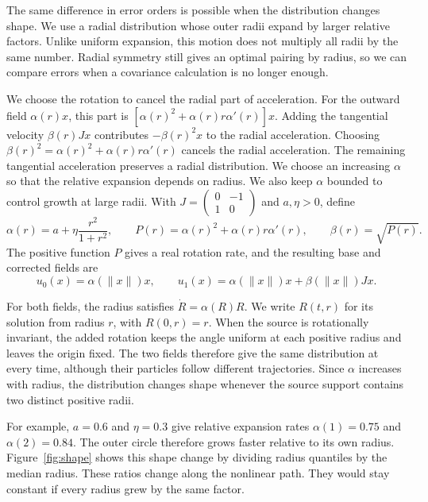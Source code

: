 The same difference in error orders is possible when the distribution changes shape. We use a radial distribution whose outer radii expand by larger relative factors. Unlike uniform expansion, this motion does not multiply all radii by the same number. Radial symmetry still gives an optimal pairing by radius, so we can compare errors when a covariance calculation is no longer enough.

We choose the rotation to cancel the radial part of acceleration. For the outward field $\alpha(r)x$, this part is $[\alpha(r)^2+\alpha(r)r\alpha'(r)]x$. Adding the tangential velocity $\beta(r)Jx$ contributes $-\beta(r)^2x$ to the radial acceleration. Choosing $\beta(r)^2=\alpha(r)^2+\alpha(r)r\alpha'(r)$ cancels the radial acceleration. The remaining tangential acceleration preserves a radial distribution. We choose an increasing $\alpha$ so that the relative expansion depends on radius. We also keep $\alpha$ bounded to control growth at large radii. With $J=\left(\begin{smallmatrix}0&-1\\1&0\end{smallmatrix}\right)$ and $a,\eta>0$, define
\begin{equation}
 \alpha(r)=a+\eta\frac{r^2}{1+r^2},\qquad
 P(r)=\alpha(r)^2+\alpha(r)r\alpha'(r),\qquad
 \beta(r)=\sqrt{P(r)}.
 \label{eq:nonlinear-coefficients}
\end{equation}
The positive function $P$ gives a real rotation rate, and the resulting base and corrected fields are
\begin{equation}
 u_0(x)=\alpha(\|x\|)x,\qquad
 u_1(x)=\alpha(\|x\|)x+\beta(\|x\|)Jx.
 \label{eq:nonlinear-fields}
\end{equation}

For both fields, the radius satisfies $\dot R=\alpha(R)R$. We write $R(t,r)$ for its solution from radius $r$, with $R(0,r)=r$. When the source is rotationally invariant, the added rotation keeps the angle uniform at each positive radius and leaves the origin fixed. The two fields therefore give the same distribution at every time, although their particles follow different trajectories. Since $\alpha$ increases with radius, the distribution changes shape whenever the source support contains two distinct positive radii.

For example, $a=0.6$ and $\eta=0.3$ give relative expansion rates $\alpha(1)=0.75$ and $\alpha(2)=0.84$. The outer circle therefore grows faster relative to its own radius. Figure~\ref{fig:shape} shows this shape change by dividing radius quantiles by the median radius. These ratios change along the nonlinear path. They would stay constant if every radius grew by the same factor.

